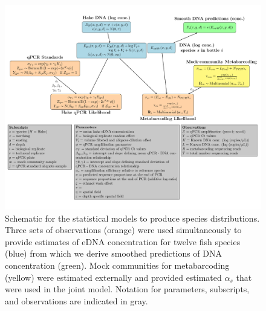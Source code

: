 \documentclass{article}
\begin{document}
\begin{figure}[tbhp] 
\centering
\includegraphics[width=16cm]{plots/DAG-Ole.pdf} 
\caption{Schematic for the statistical models to produce species distributions. Three sets of observations (orange) were used simultaneously to provide estimates of eDNA concentration for  twelve fish species (blue) from which we derive smoothed predictions of DNA concentration (green). Mock communities for metabarcoding (yellow) were estimated externally and provided estimated $\alpha_s$ that were used in the joint model. Notation for parameters, subscripts, and observations are indicated in gray.}
\label{fig:DAG2}
\end{figure}

\end{document}
